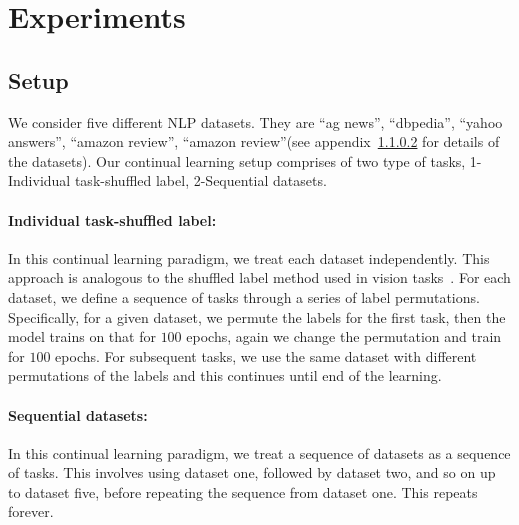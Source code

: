 \section{Experiments}

\subsection{Setup}

We consider five different NLP datasets. They are ``ag news'', ``dbpedia'', ``yahoo answers'', ``amazon review'', ``amazon review''(see appendix~\ref{} for details of the datasets).  Our continual learning setup comprises of two type of tasks, 1-Individual task-shuffled label, 2-Sequential datasets.

\paragraph{Individual task-shuffled label:}
In this continual learning paradigm, we treat each dataset independently. This approach is analogous to the shuffled label method used in vision tasks~\cite{}. For each dataset, we define a sequence of tasks through a series of label permutations. Specifically, for a given dataset, we permute the labels for the first task, then the model trains on that for $100$ epochs, again we change the permutation and train for $100$ epochs. For subsequent tasks, we use the same dataset with different permutations of the labels and this continues until end of the learning. 


\paragraph{Sequential datasets:}
In this continual learning paradigm, we treat a sequence of datasets as a sequence of tasks. This involves using dataset one, followed by dataset two, and so on up to dataset five, before repeating the sequence from dataset one. This repeats forever.

